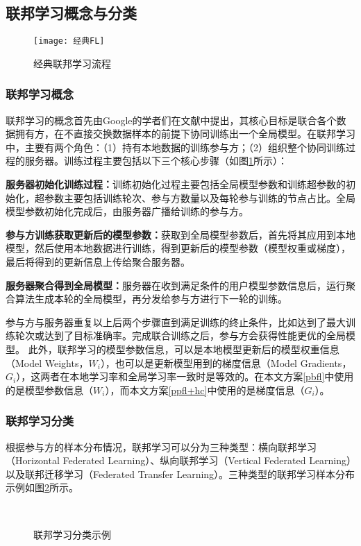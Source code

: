 \subsection{联邦学习概念与分类}
\begin{figure}
	\centering
	\texttt{[image: 经典FL]}
	\caption{经典联邦学习流程}
	\label{FL}
\end{figure}
\subsubsection{联邦学习概念}
联邦学习的概念首先由Google的学者们在文献\parencite{mcmahan2017communication}中提出，其核心目标是联合各个数据拥有方，在不直接交换数据样本的前提下协同训练出一个全局模型。在联邦学习中，主要有两个角色：（1）持有本地数据的训练参与方；（2）组织整个协同训练过程的服务器。训练过程主要包括以下三个核心步骤（如图\ref{FL}所示）：
\begin{compactenum}
	\item \textbf{服务器初始化训练过程：}训练初始化过程主要包括全局模型参数和训练超参数的初始化，超参数主要包括训练轮次、参与方数量以及每轮参与训练的节点占比。全局模型参数初始化完成后，由服务器广播给训练的参与方。
	\item \textbf{参与方训练获取更新后的模型参数：}获取到全局模型参数后，首先将其应用到本地模型，然后使用本地数据进行训练，得到更新后的模型参数（模型权重或梯度），最后将得到的更新信息上传给聚合服务器。
	\item \textbf{服务器聚合得到全局模型：}服务器在收到满足条件的用户模型参数信息后，运行聚合算法生成本轮的全局模型，再分发给参与方进行下一轮的训练。
\end{compactenum}
参与方与服务器重复以上后两个步骤直到满足训练的终止条件，比如达到了最大训练轮次或达到了目标准确率。完成联合训练之后，参与方会获得性能更优的全局模型。
此外，联邦学习的模型参数信息，可以是本地模型更新后的模型权重信息（Model Weights，$W_i$），也可以是更新模型用到的梯度信息（Model Gradients，$G_i$），这两者在本地学习率和全局学习率一致时是等效的。在本文方案\ref{pbfl}中使用的是模型参数信息（$W_i$），而本文方案\ref{ppfl+hc}中使用的是梯度信息（$G_i$）。

\subsubsection{联邦学习分类}
根据参与方的样本分布情况，联邦学习可以分为三种类型：横向联邦学习（Horizontal Federated Learning）、纵向联邦学习（Vertical Federated Learning）以及联邦迁移学习（Federated Transfer Learning）。三种类型的联邦学习样本分布示例如图\ref{fldemo}所示。
\begin{figure}
	\centering%
	 \\
	\caption{联邦学习分类示例}
	\label{fldemo}
\end{figure}

